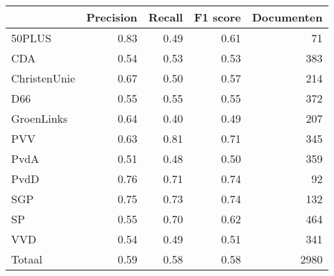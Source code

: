 \begin{tabular}{lrrrr}
\toprule
{} &  Precision &  Recall &  F1 score &  Documenten \\
\midrule
50PLUS       &       0.83 &    0.49 &      0.61 &          71 \\
CDA          &       0.54 &    0.53 &      0.53 &         383 \\
ChristenUnie &       0.67 &    0.50 &      0.57 &         214 \\
D66          &       0.55 &    0.55 &      0.55 &         372 \\
GroenLinks   &       0.64 &    0.40 &      0.49 &         207 \\
PVV          &       0.63 &    0.81 &      0.71 &         345 \\
PvdA         &       0.51 &    0.48 &      0.50 &         359 \\
PvdD         &       0.76 &    0.71 &      0.74 &          92 \\
SGP          &       0.75 &    0.73 &      0.74 &         132 \\
SP           &       0.55 &    0.70 &      0.62 &         464 \\
VVD          &       0.54 &    0.49 &      0.51 &         341 \\
Totaal       &       0.59 &    0.58 &      0.58 &        2980 \\
\bottomrule
\end{tabular}
